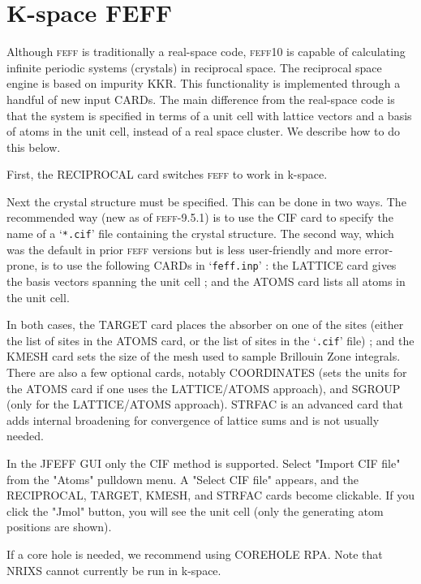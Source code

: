 \documentclass[11pt,oneside]{report} %
\newcommand{\program}[1]{\textsc{#1}}
\newcommand{\feff}{\program{feff}}
\newcommand{\vnum}{10}
\newcommand{\feffcur}{\feff\vnum}
\newcommand{\file}[1]{`\texttt{#1}'}
\begin{document}
\section{K-space FEFF}
\label{sec:kspace}

Although {\feff} is traditionally a real-space code, {\feffcur} is capable of calculating infinite periodic systems (crystals) in
reciprocal space.  The reciprocal space engine is based on impurity KKR.  This functionality is implemented through a handful of new input CARDs.  The main difference from the real-space code is that the system is specified in terms of a unit cell with lattice vectors and a basis of atoms in the unit cell, instead of a real space cluster.  We  describe how to do this below.

First, the RECIPROCAL card switches {\feff} to work in k-space.  

Next the crystal structure must be specified.  This can be done in two ways.  The recommended way (new as of {\feff}-9.5.1) is to use the CIF card to specify the name of a \file{*.cif} file containing the crystal structure.  The second way, which was the default in prior {\feff} versions but is less user-friendly and more error-prone, is to use the following CARDs in \file{feff.inp} : the LATTICE card gives the basis vectors spanning the unit cell ; and the ATOMS card lists all atoms in the unit cell. 

In both cases, the TARGET card places the absorber on one of the sites (either the list of sites in the ATOMS card, or the list of sites in the \file{.cif} file) ; and the KMESH card sets the size of the mesh used to sample Brillouin Zone integrals.  There are also a few optional cards, notably COORDINATES (sets the units for the ATOMS card if one uses the LATTICE/ATOMS approach), and SGROUP (only for the LATTICE/ATOMS approach).  STRFAC is an advanced card that adds internal broadening for convergence of lattice sums and is not usually needed.

In the JFEFF GUI only the CIF method is supported.  Select "Import CIF file" from the "Atoms" pulldown menu.  A "Select CIF file" appears, and the RECIPROCAL, TARGET, KMESH, and STRFAC cards become clickable.  If you click the "Jmol" button, you will see the unit cell (only the generating atom positions are shown).

If a core hole is needed, we recommend using COREHOLE RPA.  Note that NRIXS cannot currently be run in k-space.
\end{document}
